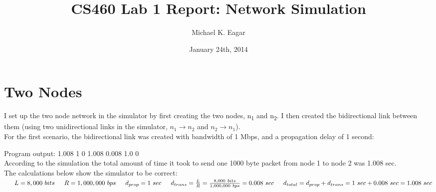\documentclass[11pt]{article}
\begin{document}

\title{CS460 Lab 1 Report: Network Simulation}

\author{Michael K. Eagar}

\date{January 24th, 2014}

\maketitle

\section{Two Nodes}

I set up the two node network in the simulator by first creating the two nodes, n\textsubscript{1} and n\textsubscript{2}. I then created the bidirectional link between them (using two unidirectional links in the simulator, $n_{1}\to{n_{2}}$ and $n_{2}\to{n_{1}}$).
\\
\noindent
For the first scenario, the bidirectional link was created with bandwidth of 1 Mbps, and a propagation delay of 1 second:


\noindent
Program output: 1.008 1 0 1.008 0.008 1.0 0\\
According to the simulation the total amount of time it took to send one 1000 byte packet from node 1 to node 2 was 1.008 sec.\\
The calculations below show the simulator to be correct:\\
$\indent L = 8,000\ bits \\
\indent R = 1,000,000\ bps \\
\indent d_{prop} = 1\ sec \\
\indent d_{trans} = \frac{L}{R} = \frac{8,000\ bits}{1,000,000\ bps} = 0.008\ sec \\
\indent d_{total} = d_{prop} + d_{trans} = 1\ sec + 0.008\ sec = 1.008\ sec$
\\
\vspace{0.25cm}
\end{document}
